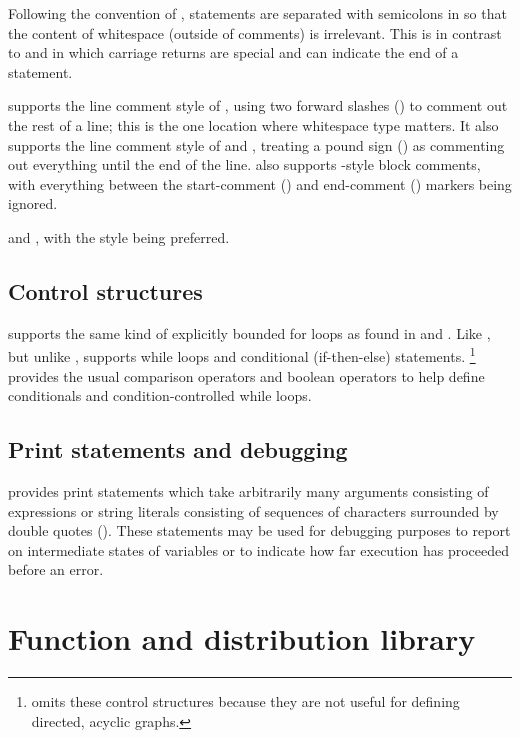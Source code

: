 \documentclass[article]{jss}
\begin{document}
Following the convention of , statements are separated
with semicolons in  so that the content of whitespace
(outside of comments) is irrelevant.  This is in contrast to
 and  in which carriage returns are
special and can indicate the end of a statement.

 supports the line comment style of ,
using two forward slashes (\code{//}) to comment out the rest of a
line; this is the one location where whitespace type matters.  It also
supports the line comment style of  and ,
treating a pound sign (\code{\#}) as commenting out everything until
the end of the line.   also supports
-style block comments, with everything between the
start-comment (\code{/*}) and end-comment (\code{*/}) markers being
ignored.


and , with the  style being preferred.  

\subsection{Control structures}

 supports the same kind of explicitly bounded for loops
as found in  and .  Like , but unlike
,  supports while loops and conditional
(if-then-else) statements.%
%
\footnote{ omits these control structures because they
  are not useful for defining directed, acyclic graphs.}
%
 provides the usual comparison operators and boolean
operators to help define conditionals and condition-controlled while
loops.  

\subsection{Print statements and debugging}

 provides print statements which take arbitrarily many
arguments consisting of expressions or string literals consisting of
sequences of characters surrounded by double quotes ().
These statements may be used for debugging purposes to report on
intermediate states of variables or to indicate how far execution has
proceeded before an error.

\section{Function and distribution library}
\end{document}

